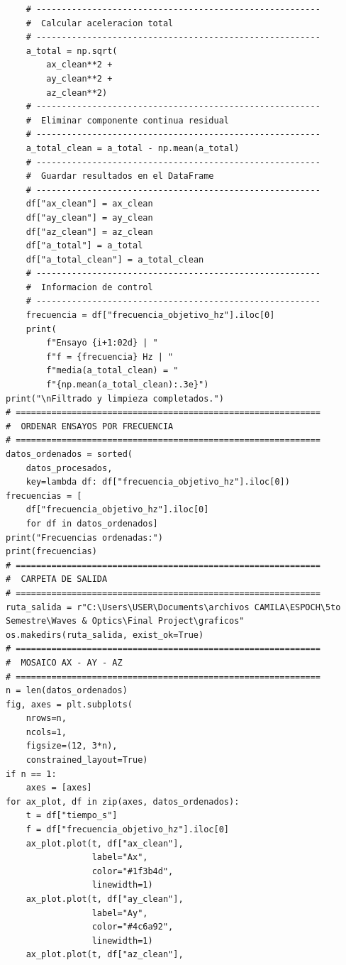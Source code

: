 \documentclass[10pt]{article}
\begin{document}
\begin{lstlisting}
    # --------------------------------------------------------
    #  Calcular aceleracion total
    # --------------------------------------------------------
    a_total = np.sqrt(
        ax_clean**2 +
        ay_clean**2 +
        az_clean**2)
    # --------------------------------------------------------
    #  Eliminar componente continua residual
    # --------------------------------------------------------
    a_total_clean = a_total - np.mean(a_total)
    # --------------------------------------------------------
    #  Guardar resultados en el DataFrame
    # --------------------------------------------------------   
    df["ax_clean"] = ax_clean
    df["ay_clean"] = ay_clean
    df["az_clean"] = az_clean
    df["a_total"] = a_total
    df["a_total_clean"] = a_total_clean
    # --------------------------------------------------------
    #  Informacion de control
    # --------------------------------------------------------
    frecuencia = df["frecuencia_objetivo_hz"].iloc[0]
    print(
        f"Ensayo {i+1:02d} | "
        f"f = {frecuencia} Hz | "
        f"media(a_total_clean) = "
        f"{np.mean(a_total_clean):.3e}")
print("\nFiltrado y limpieza completados.")
# ============================================================
#  ORDENAR ENSAYOS POR FRECUENCIA
# ============================================================
datos_ordenados = sorted(
    datos_procesados,
    key=lambda df: df["frecuencia_objetivo_hz"].iloc[0])
frecuencias = [
    df["frecuencia_objetivo_hz"].iloc[0]
    for df in datos_ordenados]
print("Frecuencias ordenadas:")
print(frecuencias)
# ============================================================
#  CARPETA DE SALIDA
# ============================================================
ruta_salida = r"C:\Users\USER\Documents\archivos CAMILA\ESPOCH\5to Semestre\Waves & Optics\Final Project\graficos"
os.makedirs(ruta_salida, exist_ok=True)
# ============================================================
#  MOSAICO AX - AY - AZ
# ============================================================
n = len(datos_ordenados)
fig, axes = plt.subplots(
    nrows=n,
    ncols=1,
    figsize=(12, 3*n),
    constrained_layout=True)
if n == 1:
    axes = [axes]
for ax_plot, df in zip(axes, datos_ordenados):
    t = df["tiempo_s"]
    f = df["frecuencia_objetivo_hz"].iloc[0]
    ax_plot.plot(t, df["ax_clean"],
                 label="Ax",
                 color="#1f3b4d",
                 linewidth=1)
    ax_plot.plot(t, df["ay_clean"],
                 label="Ay",
                 color="#4c6a92",
                 linewidth=1)
    ax_plot.plot(t, df["az_clean"],

\end{lstlisting}
\end{document}
